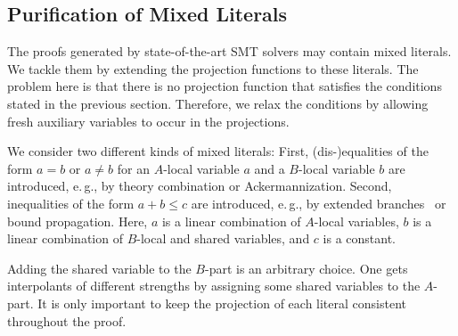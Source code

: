 \subsection{Purification of Mixed Literals}\label{sec:purification}

The proofs generated by state-of-the-art SMT solvers may contain mixed literals. We tackle them by extending the projection functions to
these literals.  The problem here is that there is no projection
function that satisfies the conditions stated in the previous section.
Therefore, we relax the conditions by allowing fresh auxiliary
variables to occur in the projections.

We consider two different kinds of mixed literals: First, 
(dis-\nobreak)equalities of the form $a=b$ or $a\neq b$ for an $A$-local
variable $a$ and a $B$-local variable $b$ are introduced, e.\,g., by theory
combination or Ackermannization. Second, inequalities of the form $a + b \leq
c$ are introduced, e.\,g., by extended branches~\cite{Dillig2011} or bound
propagation. Here, $a$ is a linear combination of $A$-local variables,
$b$ is a linear combination of $B$-local and shared variables, and $c$ is a
constant.
\begin{techreport}
Adding the shared variable to the $B$-part is an arbitrary choice.  One gets
interpolants of different strengths by assigning some shared variables to the
$A$-part. It is only important to keep the projection of each literal
consistent throughout the proof.
\end{techreport}

